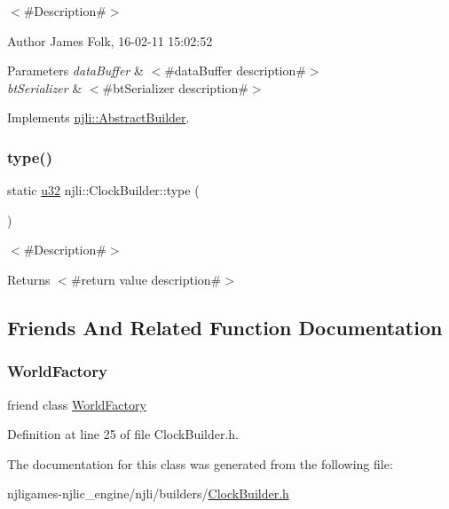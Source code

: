 $<$\#\+Description\#$>$ 

\begin{DoxyAuthor}{Author}
James Folk, 16-\/02-\/11 15\+:02\+:52
\end{DoxyAuthor}

\begin{DoxyParams}{Parameters}
{\em data\+Buffer} & $<$\#data\+Buffer description\#$>$ \\
\hline
{\em bt\+Serializer} & $<$\#bt\+Serializer description\#$>$ \\
\hline
\end{DoxyParams}


Implements \mbox{\hyperlink{classnjli_1_1_abstract_builder_ab66b774e02ccb9da554c9aab7fa6d981}{njli\+::\+Abstract\+Builder}}.

\mbox{\label{classnjli_1_1_clock_builder_ad418d0f1b84855aed3143d007eaceaa6}} 
\subsubsection{\texorpdfstring{type()}{type()}}
{\footnotesize\ttfamily static \mbox{\hyperlink{_util_8h_a10e94b422ef0c20dcdec20d31a1f5049}{u32}} njli\+::\+Clock\+Builder\+::type (\begin{DoxyParamCaption}{ }\end{DoxyParamCaption})\hspace{0.3cm}{\ttfamily [static]}}

$<$\#\+Description\#$>$

\begin{DoxyReturn}{Returns}
$<$\#return value description\#$>$ 
\end{DoxyReturn}


\subsection{Friends And Related Function Documentation}
\mbox{\label{classnjli_1_1_clock_builder_acb96ebb09abe8f2a37a915a842babfac}} 
\subsubsection{\texorpdfstring{World\+Factory}{WorldFactory}}
{\footnotesize\ttfamily friend class \mbox{\hyperlink{classnjli_1_1_world_factory}{World\+Factory}}\hspace{0.3cm}{\ttfamily [friend]}}



Definition at line 25 of file Clock\+Builder.\+h.



The documentation for this class was generated from the following file\+:\begin{DoxyCompactItemize}
\item 
njligames-\/njlic\+\_\+engine/njli/builders/\mbox{\hyperlink{_clock_builder_8h}{Clock\+Builder.\+h}}\end{DoxyCompactItemize}

